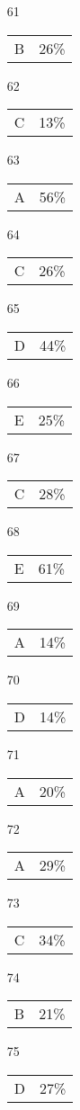 \documentclass[12pt]{article}
\begin{document}
\begin{multicols}{5}
\begin{enumerate}
\item[61] \begin{tabular}{cc} B & 26\%\end{tabular}
\item[62] \begin{tabular}{cc} C & 13\%\end{tabular}
\item[63] \begin{tabular}{cc} A & 56\%\end{tabular}
\item[64] \begin{tabular}{cc} C & 26\%\end{tabular}
\item[65] \begin{tabular}{cc} D & 44\%\end{tabular}
\item[]
\item[66] \begin{tabular}{cc} E & 25\%\end{tabular}
\item[67] \begin{tabular}{cc} C & 28\%\end{tabular}
\item[68] \begin{tabular}{cc} E & 61\%\end{tabular}
\item[69] \begin{tabular}{cc} A & 14\%\end{tabular}
\item[70] \begin{tabular}{cc} D & 14\%\end{tabular}
\item[]
\item[71] \begin{tabular}{cc} A & 20\%\end{tabular}
\item[72] \begin{tabular}{cc} A & 29\%\end{tabular}
\item[73] \begin{tabular}{cc} C & 34\%\end{tabular}
\item[74] \begin{tabular}{cc} B & 21\%\end{tabular}
\item[75] \begin{tabular}{cc} D & 27\%\end{tabular}

\end{enumerate}
\end{multicols}
\end{document}
